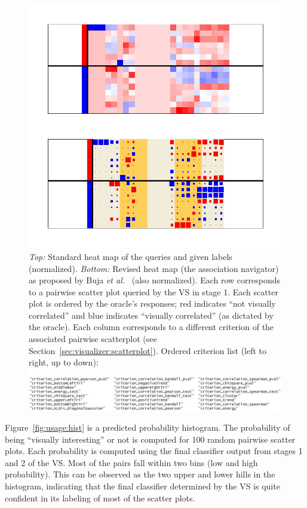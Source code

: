 \begin{figure}[H]
	\begin{center}
		\includegraphics[width=0.8\linewidth]
		{ch-usage/figures/heatmaps}
		\caption[Normalized heat maps of VS queries and user-specified labels.] 
		{\textit{Top:} Standard heat map of the queries and given labels 
		(normalized). 
		\textit{Bottom:} Revised heat map (the association navigator) as 
		proposed by Buja \textit{et al.}~\cite{buja2016} (also normalized). 
		Each row corresponds to a pairwise scatter plot queried by the VS in 
		stage 1. Each scatter plot is ordered by 
		the oracle's responses; red indicates ``not visually correlated'' 
		and blue indicates ``visually correlated'' (as dictated by the 
		oracle). Each column 
		corresponds to a different criterion of the associated pairwise 
		scatterplot (see Section~\ref{sec:visualizer:scatterplot}). Ordered 
		criterion list (left to right, up to down): 
		\includegraphics[width=1\linewidth]{ch-usage/figures/criterionlist}}
		\label{fig:usage:heatmaps}
	\end{center}
\end{figure}

Figure~\ref{fig:usage:hist} is a predicted probability histogram. The 
probability of being ``visually interesting'' or not is computed for 100 random 
pairwise scatter plots. Each probability is computed using the final 
classifier output from stages 1 and 2 of the VS. Most of the pairs fall within 
two bins (low and high probability). This can be observed as the two upper and 
lower hills in the histogram, indicating that the final classifier 
determined by the VS is quite confident in its labeling of most of the scatter 
plots.

